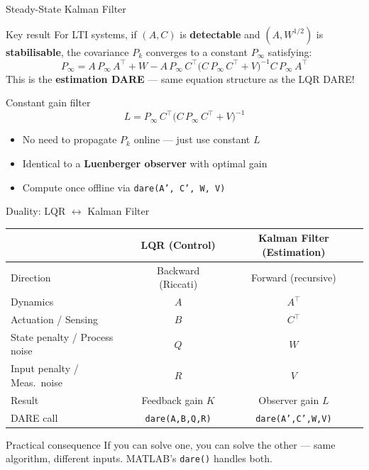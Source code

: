 \documentclass[aspectratio=169,11pt]{beamer}
\newcommand{\T}{\top}
\begin{document}
\begin{frame}[shrink=5]{Steady-State Kalman Filter}
\begin{block}{Key result}
For LTI systems, if $(A, C)$ is \textbf{detectable} and $(A, W^{1/2})$ is \textbf{stabilisable},
the covariance $P_k$ converges to a constant $P_\infty$ satisfying:
\[
  P_\infty = A\,P_\infty\,A^\T + W - A\,P_\infty\,C^\T\!\bigl(C\,P_\infty\,C^\T + V\bigr)^{-1}\!C\,P_\infty\,A^\T
\]
This is the \textbf{estimation DARE} --- same equation structure as the LQR DARE!
\end{block}

\begin{block}{Constant gain filter}
\[
  L = P_\infty\,C^\T\!\bigl(C\,P_\infty\,C^\T + V\bigr)^{-1}
\]
\begin{itemize}
  \item No need to propagate $P_k$ online --- just use constant $L$
  \item Identical to a \textbf{Luenberger observer} with optimal gain
  \item Compute once offline via \texttt{dare(A', C', W, V)}
\end{itemize}
\end{block}
\end{frame}

\begin{frame}{Duality: LQR $\longleftrightarrow$ Kalman Filter}
\begin{center}
\renewcommand{\arraystretch}{1.4}
\begin{tabular}{l c c}
\toprule
& \textbf{LQR (Control)} & \textbf{Kalman Filter (Estimation)} \\
\midrule
Direction   & Backward (Riccati)     & Forward (recursive) \\
Dynamics    & $A$                    & $A^\T$ \\
Actuation / Sensing & $B$           & $C^\T$ \\
State penalty / Process noise & $Q$ & $W$ \\
Input penalty / Meas.\ noise & $R$  & $V$ \\
Result      & Feedback gain $K$      & Observer gain $L$ \\
DARE call   & \texttt{dare(A,B,Q,R)} & \texttt{dare(A',C',W,V)} \\
\bottomrule
\end{tabular}
\end{center}

\begin{alertblock}{Practical consequence}
If you can solve one, you can solve the other --- same algorithm, different inputs.
MATLAB's \texttt{dare()} handles both.
\end{alertblock}
\end{frame}
\end{document}
